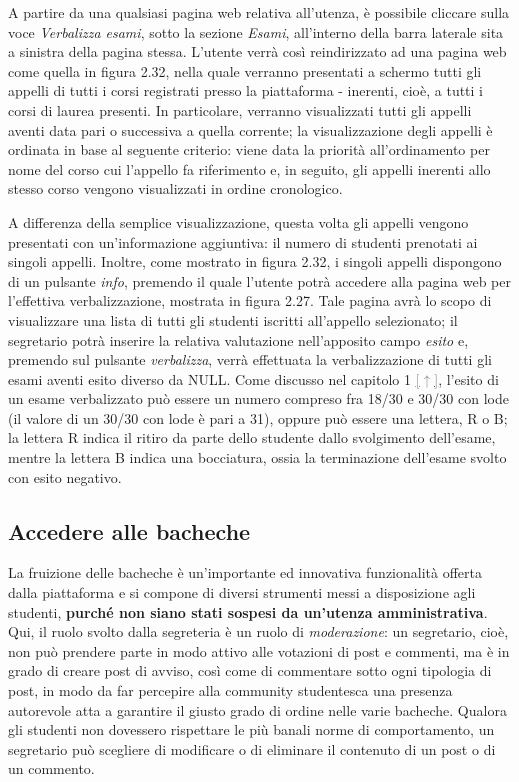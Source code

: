 \documentclass [a4paper,11pt]{book}
\begin{document}
A partire da una qualsiasi pagina web relativa all'utenza, è possibile cliccare sulla voce \emph{Verbalizza esami}, sotto la sezione \emph{Esami}, all'interno della barra laterale sita a sinistra della pagina stessa. L'utente verrà così reindirizzato ad una pagina web come quella in figura 2.32, nella quale verranno presentati a schermo tutti gli appelli di tutti i corsi registrati presso la piattaforma - inerenti, cioè, a tutti i corsi di laurea presenti. In particolare, verranno visualizzati tutti gli appelli aventi data pari o successiva a quella corrente; la visualizzazione degli appelli è ordinata in base al seguente criterio: viene data la priorità all'ordinamento per nome del corso cui l'appello fa riferimento e, in seguito, gli appelli inerenti allo stesso corso vengono visualizzati in ordine cronologico.


A differenza della semplice visualizzazione, questa volta gli appelli vengono presentati con un'informazione aggiuntiva: il numero di studenti prenotati ai singoli appelli. Inoltre, come mostrato in figura 2.32, i singoli appelli dispongono di un pulsante \emph{info}, premendo il quale l'utente potrà accedere alla pagina web per l'effettiva verbalizzazione, mostrata in figura 2.27. Tale pagina avrà lo scopo di visualizzare una lista di tutti gli studenti iscritti all'appello selezionato; il segretario potrà inserire la relativa valutazione nell'apposito campo \emph{esito} e, premendo sul pulsante \emph{verbalizza}, verrà effettuata la verbalizzazione di tutti gli esami aventi esito diverso da NULL. Come discusso nel capitolo 1 \hyperref[sec:specifiche]{\textcolor{gray}{[$\uparrow$]}}, l'esito di un esame verbalizzato può essere un numero compreso fra 18/30 e 30/30 con lode (il valore di un 30/30 con lode è pari a 31), oppure può essere una lettera, R o B; la lettera R indica il ritiro da parte dello studente dallo svolgimento dell'esame, mentre la lettera B indica una bocciatura, ossia la terminazione dell'esame svolto con esito negativo.

\medskip

\subsection{Accedere alle bacheche}

La fruizione delle bacheche è un'importante ed innovativa funzionalità offerta dalla piattaforma e si compone di diversi strumenti messi a disposizione agli studenti, \textbf{purché non siano stati sospesi da un'utenza amministrativa}. Qui, il ruolo svolto dalla segreteria è un ruolo di \emph{moderazione}: un segretario, cioè, non può prendere parte in modo attivo alle votazioni di post e commenti, ma è in grado di creare post di avviso, così come di commentare sotto ogni tipologia di post, in modo da far percepire alla community studentesca una presenza autorevole atta a garantire il giusto grado di ordine nelle varie bacheche. Qualora gli studenti non dovessero rispettare le più banali norme di comportamento, un segretario può scegliere di modificare o di eliminare il contenuto di un post o di un commento.
\end{document}
